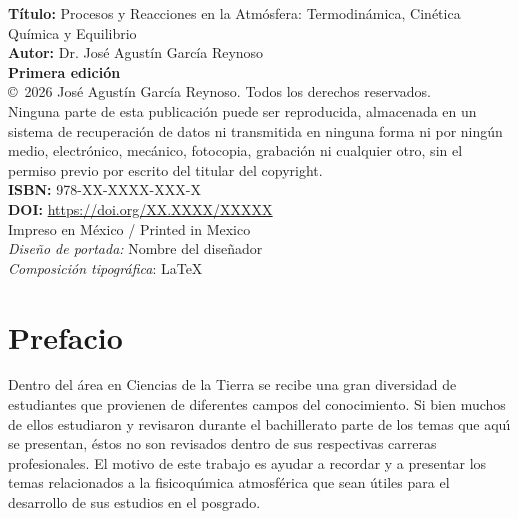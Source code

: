 \documentclass[
    11pt,                %
    twoside,             %
    openright,           %
    spanish,             %
]{book}
\begin{document}
\thispagestyle{empty}
\vspace*{\fill}
\noindent
\textbf{T\'itulo:} Procesos y Reacciones en la Atm\'osfera: Termodin\'amica, Cin\'etica Qu\'imica y Equilibrio\\[0.4em]
\textbf{Autor:} Dr. José Agustín García Reynoso\\[0.4em]
\textbf{Primera edici\'on}\\[1.5em]

\noindent
\copyright\ 2026 José Agustín García Reynoso. Todos los derechos reservados.\\[0.5em]

\noindent
Ninguna parte de esta publicaci\'on puede ser reproducida, almacenada en un sistema de recuperaci\'on de datos ni transmitida en ninguna forma ni por ning\'un medio, electr\'onico, mec\'anico, fotocopia, grabaci\'on ni cualquier otro, sin el permiso previo por escrito del titular del copyright.\\[1em]

\noindent
\textbf{ISBN:} 978-XX-XXXX-XXX-X\\[0.3em]
\textbf{DOI:} \url{https://doi.org/XX.XXXX/XXXXX}\\[1.5em]

\noindent
Impreso en M\'exico / Printed in Mexico\\[0.3em]

\noindent
\textit{Dise\~no de portada:} Nombre del dise\~nador\\
\textit{Composici\'on tipogr\'afica}: \LaTeX{}
\clearpage

\frontmatter                         %
\pagestyle{fancy}

\chapter*{Prefacio}

Dentro del \'area en Ciencias de la Tierra se recibe una gran diversidad de estudiantes que provienen de diferentes campos del conocimiento. Si bien muchos de ellos estudiaron y revisaron durante el bachillerato parte de los temas que aqu\'{\i} se presentan, \'estos no son revisados dentro de sus respectivas carreras profesionales. El motivo de este trabajo es ayudar  a recordar y a presentar los temas relacionados a la fisicoqu\'{\i}mica atmosf\'erica que sean \'utiles para el desarrollo de sus estudios en el posgrado.
\end{document}
